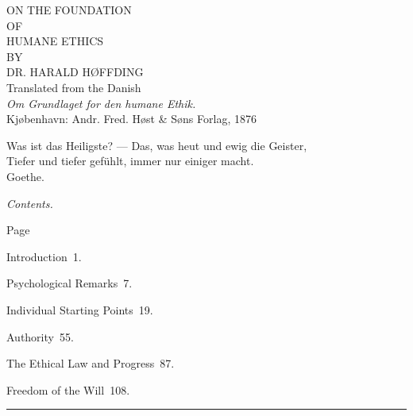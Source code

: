 \documentclass[12pt,a4paper,openany]{book}
\newcommand{\tocline}[2]{\noindent #1\dotfill\ #2\par}
\begin{document}
\begin{titlepage}
\begin{center}
\vspace*{3em}
{\large ON THE FOUNDATION}\\[0.8em]
OF\\[0.8em]
{\LARGE HUMANE ETHICS}\\[2em]
BY\\[1em]
DR. HARALD HØFFDING\\[2em]
\vfill
{\small Translated from the Danish}\\[0.6em]
{\small \textit{Om Grundlaget for den humane Ethik.}\\
Kjøbenhavn: Andr. Fred. Høst \& Søns Forlag, 1876}
\end{center}
\end{titlepage}
\thispagestyle{empty}
\vspace*{2em}
\begin{flushright}
Was ist das Heiligste? --- Das, was heut und ewig die Geister,\\
Tiefer und tiefer gefühlt, immer nur einiger macht.\\
\hfill Goethe.
\end{flushright}
\clearpage
\thispagestyle{empty}
\begin{center}{\large \emph{Contents.}}\end{center}
\hfill Page\par
\tocline{Introduction}{1.}
\tocline{Psychological Remarks}{7.}
\tocline{Individual Starting Points}{19.}
\tocline{Authority}{55.}
\tocline{The Ethical Law and Progress}{87.}
\tocline{Freedom of the Will}{108.}
\medskip
{}
\begin{center}\rule{4em}{0.4pt}\end{center}
\clearpage
\end{document}
